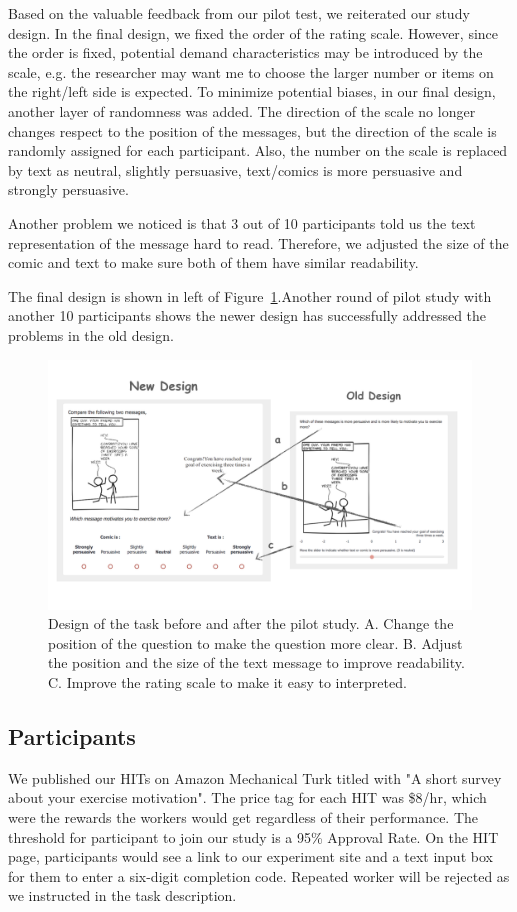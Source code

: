 Based on the valuable feedback from our pilot test, we reiterated our study design. In the final design, we fixed the order of the rating scale. However, since the order is fixed, potential demand characteristics may be introduced by the scale, e.g. the researcher may want me to choose the larger number or items on the right/left side is expected. To minimize potential biases, in our final design, another layer of randomness was added. The direction of the scale no longer changes respect to the position of the messages, but the direction of the scale is randomly assigned for each participant. Also, the number on the scale is replaced by text as neutral, slightly persuasive, text/comics is more persuasive and strongly persuasive.\par

Another problem we noticed is that 3 out of 10 participants told us the text representation of the message hard to read. Therefore, we adjusted the size of the comic and text to make sure both of them have similar readability.\par

The final design is shown in left of Figure~\ref{fig:change}.Another round of pilot study with another 10 participants shows the newer design has successfully addressed the problems in the old design.\par

\begin{figure}
  \centering
  \includegraphics[width=0.95\columnwidth]{figures/change}
  \caption{Design of the task before and after the pilot study. A. Change the position of the question to make the question more clear. B. Adjust the position and the size of the text message to improve readability. C. Improve the rating scale to make it easy to interpreted.}
  \label{fig:change}
\end{figure}


\subsection{Participants}
We published our HITs on Amazon Mechanical Turk titled with "A short survey about your exercise motivation". The price tag for each HIT was \$8/hr, which were the rewards the workers would get regardless of their performance. The threshold for participant to join our study is a 95\% Approval Rate. On the HIT page, participants would see a link to our experiment site and a text input box for them to enter a six-digit completion code. Repeated worker will be rejected as we instructed in the task description.\par
